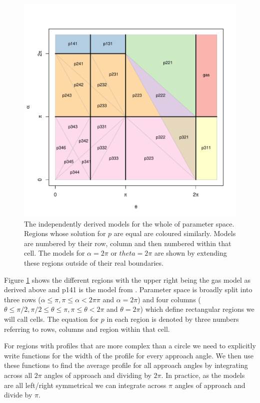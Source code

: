 \documentclass[a4paper,10pt,reqno,oneside]{amsart}
\begin{document}
\begin{figure}
\centering
\includegraphics[width=1\textwidth]{imgs/equalRegions.pdf}
\caption{The independently derived models for the whole of parameter space. Regions whose solution for $p$ are equal are coloured similarly. Models are numbered by their row, column and then numbered within that cell. The models for $\alpha = 2\pi$ or $theta =  2\pi$ are shown by extending these regions outside of their real boundaries.}
\label{f:regions}
\end{figure}

Figure \ref{f:regions} shows the different regions with the upper right being the gas model as derived above and p141 is the model from \citep{rowcliffe2008estimating}. Parameter space is broadly split into three rows ($ \alpha \le \pi, \pi \le \alpha < 2π\pi$ and $ \alpha = 2\pi$) and four columns ($ \theta \le \pi/2,  \pi/2 \le \theta \le  \pi,  \pi \le \theta < 2\pi$ and $\theta = 2\pi$) which define rectangular regions we will call cells. The equation for $p$ in each region is denoted by three numbers referring to rows, columns and region within that cell. 

For regions with profiles that are more complex than a circle we need to explicitly write functions for the width of the profile for every approach angle. We then use these functions to find the average profile for all approach angles by integrating across all $2\pi$ angles of approach and dividing by $2\pi$. In practice, as the models are all left/right symmetrical we can integrate across $\pi$ angles of approach and divide by $\pi$.
\end{document}

